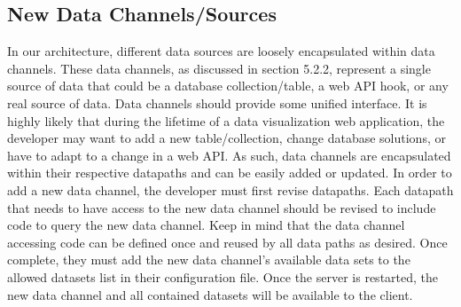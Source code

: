 \subsection{New Data Channels/Sources}
In our architecture, different data sources are loosely encapsulated within data channels.  These data channels, as discussed in section 5.2.2, represent a single source of data that could be a database collection/table, a web API hook, or any real source of data.  Data channels should provide some unified interface.  It is highly likely that during the lifetime of a data visualization web application, the developer may want to add a new table/collection, change database solutions, or have to adapt to a change in a web API.  As such, data channels are encapsulated within their respective datapaths and can be easily added or updated.  In order to add a new data channel, the developer must first revise datapaths.  Each datapath that needs to have access to the new data channel should be revised to include code to query the new data channel.  Keep in mind that the data channel accessing code can be defined once and reused by all data paths as desired.  Once complete, they must add the new data channel’s available data sets to the allowed datasets list in their configuration file.  Once the server is restarted, the new data channel and all contained datasets will be available to the client. \par
